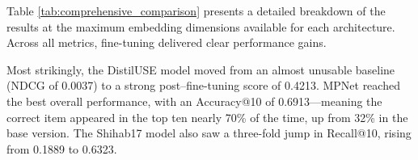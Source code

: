 \documentclass[manuscript,screen,review]{acmart}
\begin{document}
\begin{table}[!htbp]
    \centering
    \caption{Comparative Performance of Fine-Tuned (FT) Models vs. Baselines at Maximum Dimensions. The best scores are highlighted in \textbf{bold}. The $\dagger$ symbol indicates that the best model (MPNet) is statistically significantly better than the second-best model (Shihab17) with $p < 0.001$.}
    \label{tab:comprehensive_comparison}
\end{table}


Table \ref{tab:comprehensive_comparison} presents a detailed breakdown of the results at the maximum embedding dimensions available for each architecture. Across all metrics, fine-tuning delivered clear performance gains.

Most strikingly, the DistilUSE model moved from an almost unusable baseline (NDCG of 0.0037) to a strong post–fine-tuning score of 0.4213. MPNet reached the best overall performance, with an Accuracy@10 of 0.6913—meaning the correct item appeared in the top ten nearly 70\% of the time, up from 32\% in the base version. The Shihab17 model also saw a three-fold jump in Recall@10, rising from 0.1889 to 0.6323.
\end{document}
